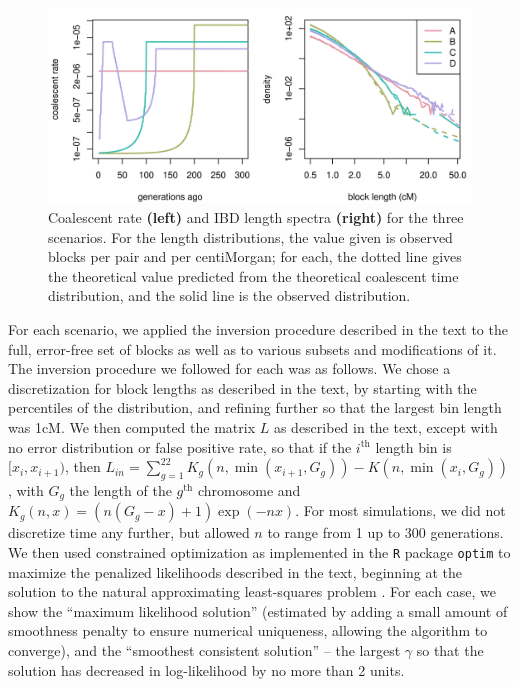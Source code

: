 \documentclass{article}
\begin{document}
\begin{figure}[htp!]
\begin{center}
\includegraphics{spectra-comparisons}
\caption{
\label{fig:spectra_comparisons}
Coalescent rate {\bf (left)} and IBD length spectra {\bf (right)} for the three scenarios.
For the length distributions, the value given is observed blocks per pair and per centiMorgan;
for each, the dotted line gives the theoretical value predicted from the theoretical coalescent time distribution,
and the solid line is the observed distribution.
}
\end{center}
\end{figure}

For each scenario, we applied the inversion procedure described in the text to the full, error-free set of blocks
as well as to various subsets and modifications of it.
The inversion procedure we followed for each was as follows.
We chose a discretization for block lengths as described in the text,
by starting with the percentiles of the distribution,
and refining further so that the largest bin length was 1cM.
We then computed the matrix $L$ as described in the text,
except with no error distribution or false positive rate, 
so that if the $i^\mathrm{th}$ length bin is $[x_i,x_{i+1})$,
then $L_{in} = \sum_{g=1}^{22} K_g(n,\min(x_{i+1},G_g)) - K(n,\min(x_i,G_g))$,
with $G_g$ the length of the $g^\mathrm{th}$ chromosome and $K_g(n,x) = (n(G_g-x)+1)\exp(-nx)$.
For most simulations, we did not discretize time any further,
but allowed $n$ to range from 1 up to 300 generations.
We then used constrained optimization as implemented in the {\tt R} package {\tt optim} \citep[L-BFGS-B method,][]{R}
to maximize the penalized likelihoods described in the text,
beginning at the solution to the natural approximating least-squares problem \citep[using {\tt quadprog},][]{quadprog}.
For each case, we show the ``maximum likelihood solution''
(estimated by adding a small amount of smoothness penalty to ensure numerical uniqueness, allowing the algorithm to converge),
and the ``smoothest consistent solution'' 
-- the largest $\gamma$ so that the solution has decreased in log-likelihood by no more than 2 units.
\end{document}
